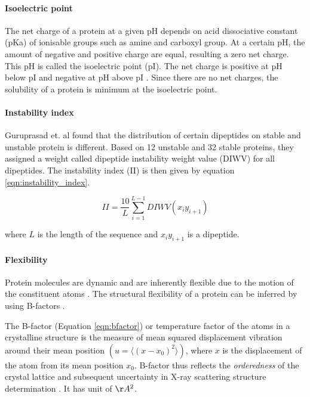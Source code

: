 \paragraph{Isoelectric point}
The net charge of a protein at a given pH depends on acid dissociative constant (pKa) of ionisable groups such as amine and carboxyl group. At a certain pH, the amount of negative and positive charge are equal, resulting a zero net charge. This pH is called the isoelectric point (pI). The net charge is positive at pH below pI and negative at pH above pI \cite{shaw2001effect}. Since there are no net charges, the solubility of a protein is minimum at the isoelectric point.

\paragraph{Instability index}
Guruprasad et. al \cite{guruprasad1990correlation} found that the distribution of certain dipeptides on stable and unstable protein is different. Based on 12 unstable and 32 stable proteins, they assigned a weight called dipeptide instability weight value (DIWV) for all dipeptides. The instability index (II) is then given by equation \ref{eqn:instability_index}.

\begin{equation}
    II = \frac{10}{L}\sum_{i=1}^{L-1}DIWV(x_i y_{i+1})
    \label{eqn:instability_index}
\end{equation}

where $L$ is the length of the sequence and $x_i y_{i+1}$ is a dipeptide.


\paragraph{Flexibility}
Protein molecules are dynamic and are inherently flexible due to the motion of the constituent atoms \cite{vihinen1994accuracy, alvarez2014relationship, teilum2009functional}. The structural flexibility of a protein can be inferred by using B-factors \cite{vihinen1994accuracy, Karplus1985-ea, Smith2003-gb}.


The B-factor (Equation \ref{eqn:bfactor}) or temperature factor of the atoms in a crystalline structure is the measure of mean squared displacement vibration around their mean position $(u = \langle (x-x_0)^2 \rangle)$, where $x$ is the displacement of the atom from its mean position $x_0$. B-factor thus reflects the \textit{orderedness} of the crystal lattice and subsequent uncertainty in X-ray scattering structure determination \cite{Schlessinger2005-ps, Carugo2018-ka, Bramer2018-dh}. It has unit of $\AA^2$.



